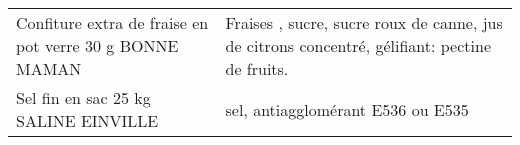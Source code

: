 \begin{longtable}{p{5cm}p{10cm}}
                                                  Confiture extra de fraise en pot verre 30 g BONNE MAMAN &                                                                                                                                                                                                                                                                                                                                                                                                                                                                                                                                                                                                                                                                                                                                                                                                                                                                                                                                            Fraises , sucre, sucre roux de canne, jus de citrons concentré, gélifiant: pectine de fruits. \\
                                                                     Sel fin en sac 25 kg SALINE EINVILLE &                                                                                                                                                                                                                                                                                                                                                                                                                                                                                                                                                                                                                                                                                                                                                                                                                                                                                                                                                                                                        sel, antiagglomérant E536 ou E535 \\

\end{longtable}

